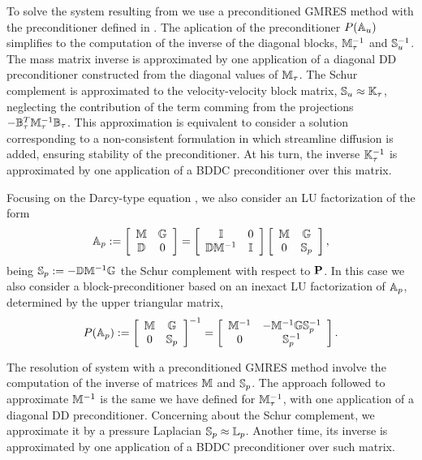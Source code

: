 To solve the system resulting from  we use a preconditioned GMRES method with the preconditioner defined in . The aplication of the preconditioner $ P(\A_u) $ simplifies to the computation of the inverse of the diagonal blocks, $ \M_\tau^{-1} $ and $ \Sb_u^{-1} $. The mass matrix inverse is approximated by one application of a diagonal DD preconditioner constructed from the diagonal values of $ \M_\tau $. The Schur complement is approximated to the velocity-velocity block matrix, $ \Sb_u\approx\K_\tau $, neglecting the contribution of the term comming from the projections $ -\B_\tau^T\M_\tau^{-1}\B_\tau $. This approximation is equivalent to consider a solution corresponding to a non-consistent formulation in which streamline diffusion is added, ensuring stability of the preconditioner. At his turn, the inverse $ \K_\tau^{-1} $ is approximated by one application of a BDDC preconditioner over this matrix.

Focusing on the Darcy-type equation , we also consider an LU factorization of the form
\begin{equation}
\label{SRK_p_mat}
\A_p:=\left[\begin{array}{cc}
\M&\G\\
\D&0
\end{array}\right]=\left[\begin{array}{cc}
\I&0\\
\D\M^{-1}&\I
\end{array}\right]\left[\begin{array}{cc}
\M&\G\\
0&\Sb_p
\end{array}\right],
\end{equation}
being $ \Sb_p:=-\D\M^{-1}\G$ the Schur complement with respect to $\P$. In this case we also consider a block-preconditioner based on an inexact LU factorization of $ \A_p $, determined by the upper triangular matrix,
\begin{equation}
\label{SRK_p_prec}
P(\A_p):=\left[\begin{array}{cc}
\M&\G\\
0&\Sb_p
\end{array}\right]^{-1}=\left[\begin{array}{cc}
\M^{-1}&-\M^{-1}\G\Sb_p^{-1}\\
0&\Sb_p^{-1}
\end{array}\right].
\end{equation}

The resolution of system  with a preconditioned GMRES method involve the computation of the inverse of matrices $ \M $ and $ \Sb_p $. The approach followed to approximate $ \M^{-1} $ is the same we have defined for $ \M_\tau^{-1} $, with one application of a diagonal DD preconditioner. Concerning about the Schur complement, we approximate it by a pressure Laplacian $ \Sb_p\approx\L_p $. Another time, its inverse is approximated by one application of a BDDC preconditioner over such matrix.

